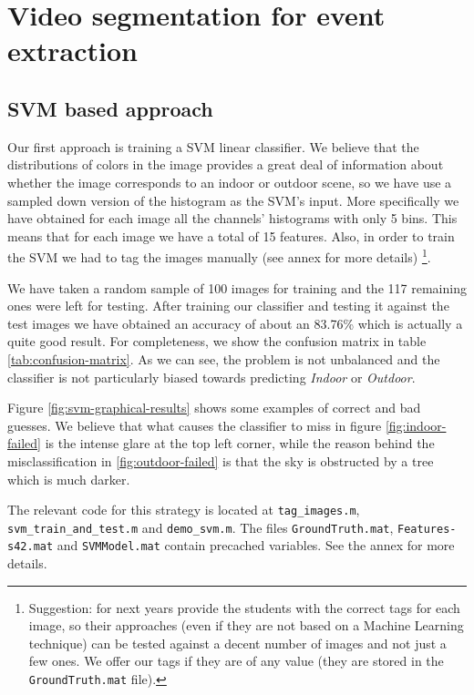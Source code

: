 \section{Video segmentation for event extraction}

\subsection{SVM based approach}

Our first approach is training a SVM linear classifier. We believe that the distributions of colors in the image provides a great deal of information about whether the image corresponds to an indoor or outdoor scene, so we have use a sampled down version of the histogram as the SVM's input. More specifically we have obtained for each image all the channels' histograms with only 5 bins. This means that for each image we have a total of 15 features. Also, in order to train the SVM we had to tag the images manually (see annex for more details)
\footnote{Suggestion: for next years provide the students with the correct tags for each image, so their approaches (even if they are not based on a Machine Learning technique) can be tested against a decent number of images and not just a few ones. We offer our tags if they are of any value (they are stored in the \texttt{GroundTruth.mat} file).}.

We have taken a random sample of 100 images for training and the 117 remaining ones were left for testing. After training our classifier and testing it against the test images we have obtained an accuracy of about an 83.76\% which is actually a quite good result. For completeness, we show the confusion matrix in table \ref{tab:confusion-matrix}. As we can see, the problem is not unbalanced and the classifier is not particularly biased towards predicting \emph{Indoor} or \emph{Outdoor}.

Figure \ref{fig:svm-graphical-results} shows some examples of correct and bad guesses. We believe that what causes the classifier to miss in figure \ref{fig:indoor-failed} is the intense glare at the top left corner, while the reason behind the misclassification in \ref{fig:outdoor-failed} is that the sky is obstructed by a tree which is much darker.

The relevant code for this strategy is located at \texttt{tag\_images.m}, \texttt{svm\_train\_and\_test.m} and \texttt{demo\_svm.m}. The files \texttt{GroundTruth.mat}, \texttt{Features-s42.mat} and \texttt{SVMModel.mat} contain precached variables. See the annex for more details.

